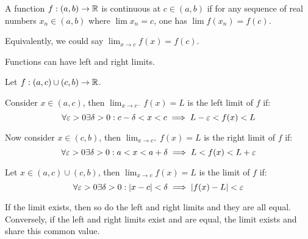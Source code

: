 \documentclass[a4paper,10pt]{article}
\begin{document}
\begin{defn}[Continuous]
	A function $f: (a,b) \to \mathbb{R}$ is continuous at $c \in (a,b)$
	if for any sequence of real numbers $x_n \in (a,b)$ where $\lim
	x_n = c$, one has $\lim f(x_n) = f(c)$.

	Equivalently, we could say $\lim_{x \to c} f(x) = f(c)$.

\end{defn}

\begin{defn}
	Functions can have left and right limits.

	Let $f: (a,c) \cup (c,b) \to \mathbb{R}$.

	Consider $x \in (a,c)$, then $\lim_{x \to c^-} f(x) = L$ is the
	left limit of $f$ if:
	\[
		\forall \varepsilon > 0 \exists \delta > 0 :
		c - \delta < x < c \implies L - \varepsilon < f(x) < L
	\]

	Now consider $x \in (c,b)$, then $\lim_{x \to c^+} f(x) = L$ is
	the right limit of $f$ if:
	\[
		\forall \varepsilon > 0 \exists \delta > 0 :
		a < x < a + \delta \implies L < f(x) < L + \varepsilon
	\]

	Let $x \in (a,c) \cup (c,b)$, then $\lim_{x \to c} f(x) = L$ is
	the limit of $f$ if:
	\[
		\forall \varepsilon > 0 \exists \delta > 0 :
		|x-c| < \delta \implies |f(x) - L| < \varepsilon
	\]

	If the limit exists, then so do the left and right limits and they are
	all equal. Conversely, if the left and right limits exist and are equal,
	the limit exists and share this common value.
\end{defn}
\end{document}
